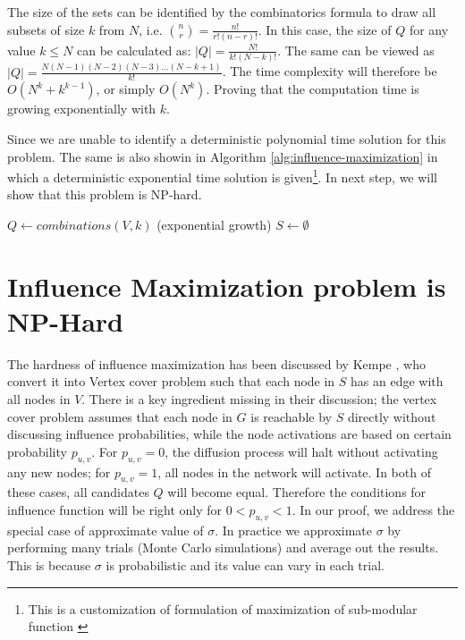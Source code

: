 	The size of the sets can be identified by the combinatorics formula to draw all subsets of size $k$ from $N$, i.e. ${n\choose r}=\frac{n!}{r!(n-r)!}$. In this case, the size of $Q$ for any value $k\leq N$ can be calculated as: $|Q|=\frac{N!}{k!(N-k)!}$. The same can be viewed as $|Q|=\frac{N(N-1)(N-2)(N-3)...(N-k+1)}{k!}$. The time complexity will therefore be $O(N^k+k^{k-1})$, or simply $O(N^k)$. Proving that the computation time is growing exponentially with $k$.
	
	Since we are unable to identify a deterministic polynomial time solution for this problem. The same is also showin in Algorithm \ref{alg:influence-maximization} in which a deterministic exponential time solution is given\footnote{This is a customization of formulation of maximization of sub-modular function \cite{nemhauser1978}}. In next step, we will show that this problem is NP-hard.

	\begin{algorithm}[h]
		\caption{Deterministic exponential time algorithm for Influence Maximization problem}
		\label{alg:influence-maximization}
		\SetAlgoLined
		$Q \gets combinations(V, k)$ (exponential growth)
		\newline
		$S \gets \emptyset$
		\newline
	\end{algorithm}
	
	\section{Influence Maximization problem is NP-Hard}
	\label{sec:proof-np-hard}
	The hardness of influence maximization has been discussed by Kempe \cite{kempe2003}, who convert it into Vertex cover problem such that each node in $S$ has an edge with all nodes in $V$. There is a key ingredient missing in their discussion; the vertex cover problem assumes that each node in $G$ is reachable by $S$ directly without discussing influence probabilities, while the node activations are based on certain probability $p_{u,v}$. For $p_{u,v}=0$, the diffusion process will halt without activating any new nodes; for $p_{u,v}=1$, all nodes in the network will activate. In both of these cases, all candidates $Q$ will become equal. Therefore the conditions for influence function will be right only for $0<p_{u,v}<1$. In our proof, we address the special case of approximate value of $\sigma$. In practice we approximate $\sigma$ by performing many trials (Monte Carlo simulations) and average out the results. This is because $\sigma$ is probabilistic and its value can vary in each trial.
	
